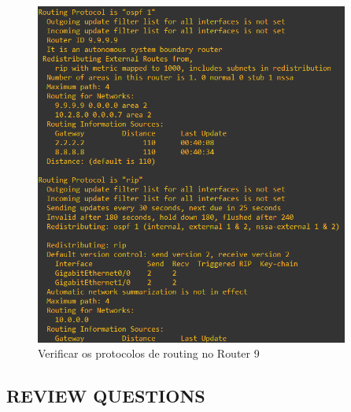 \documentclass[11pt,english, openright, oneside]{book}
\begin{document}
\begin{itemize}
  \begin{figure}[H]
    \centering
    \includegraphics[width=0.92\textwidth]{imagens/Tarefa4/22.ip_protocols_R9.png}
    \caption{Verificar os protocolos de routing no Router 9}
    \label{fig:config38}
  \end{figure}
  \vspace{0.2cm}
\end{itemize}

\newpage
\subsection{REVIEW QUESTIONS}
\vspace{0.2cm}
\end{document}
